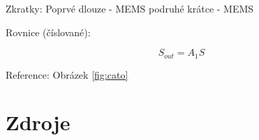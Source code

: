 \documentclass[]{article}
\begin{document}
Zkratky: Poprvé dlouze - \ac{MEMS} podruhé krátce - \ac{MEMS}

Rovnice (číslované):

\begin{equation}
    S_{out} = A_1 S
\end{equation}

Reference: Obrázek \ref{fig:cato}

\pagebreak
\section{Zdroje}
\begingroup
\renewcommand{\section}[2]{}

 
\endgroup
\end{document}
